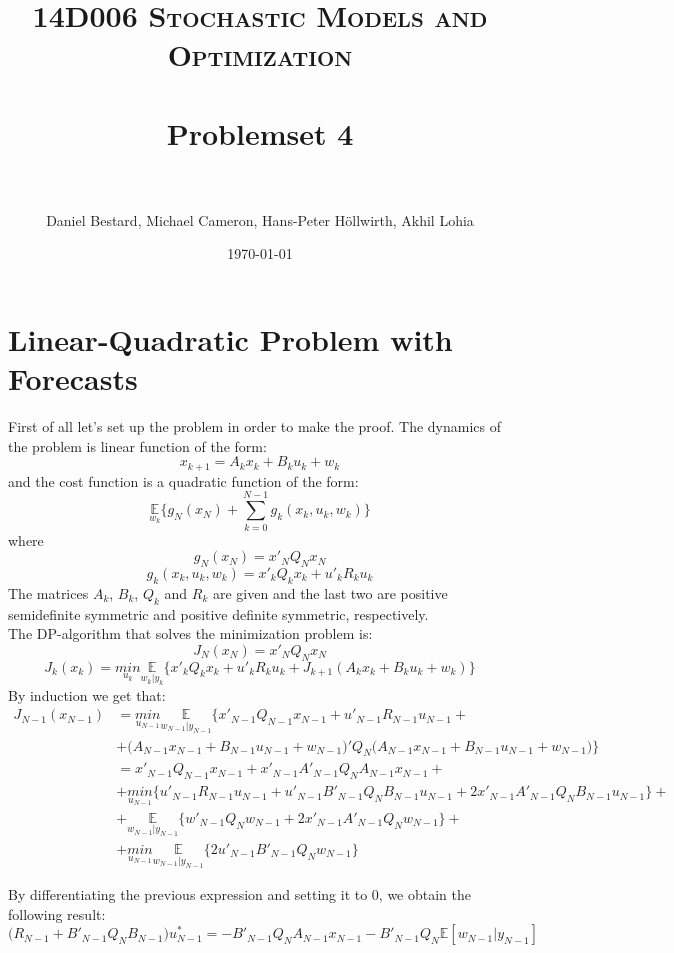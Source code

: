 \documentclass[11pt, oneside]{article}   	%
\title{
\normalfont \normalsize
\textsc{14D006 Stochastic Models and Optimization} \\ [25pt] %
\horrule{0.5pt} \\[0.4cm] %
\huge Problemset 4\\ %
\horrule{2pt} \\[0.5cm] %
}
\author{Daniel Bestard, Michael Cameron, Hans-Peter H{\"o}llwirth, Akhil Lohia} %
\date{\normalsize\today} %
\begin{document}
\maketitle


\section{Linear-Quadratic Problem with Forecasts}
First of all let's set up the problem in order to make the proof. The dynamics of the problem is linear function of the form:
$$x_{k+1} = A_{k}x_{k} + B_{k}u_{k} + w_{k}$$
and the cost function is a quadratic function of the form:
$$\underset{w_{k}}{\mathbb{E}}\bigg\{g_{N}(x_{N}) + \sum_{k=0}^{N-1}g_{k}(x_{k},u_{k},w_{k})\bigg\}$$
where
$$g_{N}(x_{N}) = x'_{N}Q_{N}x_{N}$$
$$g_{k}(x_{k},u_{k},w_{k}) = x'_{k}Q_{k}x_{k} + u'_{k}R_{k}u_{k}$$
The matrices $A_{k}$, $B_{k}$, $Q_{k}$ and $R_{k}$ are given and the last two are positive semidefinite symmetric and positive definite symmetric, respectively.\\

The DP-algorithm that solves the minimization problem is:
$$J_{N}(x_{N}) = x'_{N}Q_{N}x_{N}$$
$$J_{k}(x_{k}) = \underset{u_{k}}{min} \underset{w_{k}|y_{k}}{\mathbb{E}} \bigg\{x'_{k}Q_{k}x_{k} + u'_{k}R_{k}u_{k} + J_{k+1}(A_{k}x_{k} + B_{k}u_{k} + w_{k})\bigg\}$$
By induction we get that:
\begin{align*}
J_{N-1}(x_{N-1}) &= \underset{u_{N-1}}{min} \underset{w_{N-1}|y_{N-1}}{\mathbb{E}} \bigg\{x'_{N-1}Q_{N-1}x_{N-1} + u'_{N-1}R_{N-1}u_{N-1} + \\
&+ \big(A_{N-1}x_{N-1} + B_{N-1}u_{N-1} + w_{N-1}\big)'Q_{N}\big(A_{N-1}x_{N-1} + B_{N-1}u_{N-1} + w_{N-1}\big) \bigg\}\\
&= x'_{N-1}Q_{N-1}x_{N-1} + x'_{N-1}A'_{N-1}Q_{N}A_{N-1}x_{N-1} +\\
&+ \underset{u_{N-1}}{min}\bigg\{ u'_{N-1}R_{N-1}u_{N-1} + u'_{N-1}B'_{N-1}Q_{N}B_{N-1}u_{N-1} + 2x'_{N-1}A'_{N-1}Q_{N}B_{N-1}u_{N-1}\bigg\} + \\
&+ \underset{w_{N-1}|y_{N-1}}{\mathbb{E}}\bigg\{ w'_{N-1}Q_{N}w_{N-1} + 2x'_{N-1}A'_{N-1}Q_{N}w_{N-1}\bigg\} + \\
&+ \underset{u_{N-1}}{min} \underset{w_{N-1}|y_{N-1}}{\mathbb{E}} \bigg\{2u'_{N-1}B'_{N-1}Q_{N}w_{N-1}\bigg\}
\end{align*}

By differentiating the previous expression and setting it to 0, we obtain the following result:
$$\big(R_{N-1} + B'_{N-1}Q_{N}B_{N-1}\big)u_{N-1}^{*} = -B'_{N-1}Q_{N}A_{N-1}x_{N-1} - B'_{N-1}Q_{N}\mathbb{E}[w_{N-1}|y_{N-1}]$$
\end{document}

